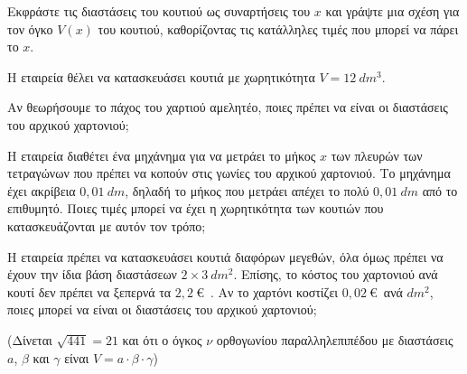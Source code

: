 \begin{alist}
\item Εκφράστε τις διαστάσεις του κουτιού ως συναρτήσεις του $x$ και γράψτε μια σχέση για τον όγκο $V(x)$ του κουτιού, καθορίζοντας τις κατάλληλες τιμές που μπορεί να πάρει το $x$.
\item Η εταιρεία θέλει να κατασκευάσει κουτιά με χωρητικότητα $V = 12\ dm^{3}$.

\begin{rlist}
\item Αν θεωρήσουμε το πάχος του χαρτιού αμελητέο, ποιες πρέπει να είναι οι διαστάσεις του αρχικού χαρτονιού;
\item Η εταιρεία διαθέτει ένα μηχάνημα για να μετράει το μήκος $x$ των πλευρών των τετραγώνων που πρέπει να κοπούν στις γωνίες του αρχικού χαρτονιού. Το μηχάνημα έχει ακρίβεια $0{,}01\ dm$, δηλαδή το μήκος που μετράει απέχει το πολύ $0{,}01\ dm$ από το επιθυμητό. Ποιες τιμές μπορεί να έχει η χωρητικότητα των κουτιών που κατασκευάζονται με αυτόν τον τρόπο;
\end{rlist}
\item Η εταιρεία πρέπει να κατασκευάσει κουτιά διαφόρων μεγεθών, όλα όμως πρέπει να έχουν την ίδια βάση διαστάσεων $2 \times 3\ dm^{2}$. Επίσης, το κόστος του χαρτονιού ανά κουτί δεν πρέπει να ξεπερνά τα $2{,}2\ $\euro\ . Αν το χαρτόνι κοστίζει $0{,}02\ $\euro\  ανά $dm^{2}$, ποιες μπορεί να είναι οι διαστάσεις του αρχικού χαρτονιού;

(Δίνεται $\sqrt{441} = 21$ και ότι ο όγκος $\nu$ ορθογωνίου παραλληλεπιπέδου με διαστάσεις $a$, $\beta$ και $\gamma$ είναι $V = a \cdot \beta \cdot \gamma$)
\end{alist}

